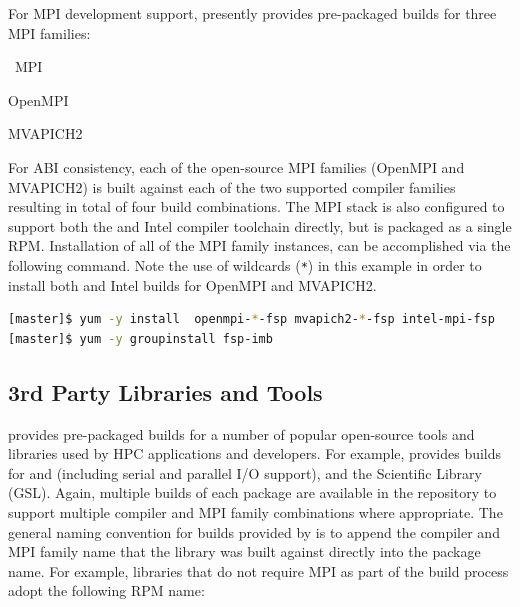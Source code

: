 \documentclass[letterpaper]{article}
\begin{document}
For MPI development support, \FSP{} presently provides pre-packaged builds for
three MPI families: 

\begin{itemize*}
\item \Intel{}~MPI
\item OpenMPI
\item MVAPICH2
\end{itemize*}
 For ABI consistency, each of the open-source MPI families (OpenMPI and
 MVAPICH2) is built against each of the two supported compiler families
 resulting in total of four build combinations.  The \Intel{} MPI stack is also
 configured to support both the \GNU{} and Intel compiler toolchain directly, but
 is packaged as a single RPM. Installation of all of the MPI family instances,
 can be accomplished via the following command. Note the use of wildcards
 (\texttt{*}) in this example in order to install both \GNU{} and Intel builds for
 OpenMPI and MVAPICH2.

\begin{lstlisting}[language=bash]
[master]$ yum -y install  openmpi-*-fsp mvapich2-*-fsp intel-mpi-fsp
[master]$ yum -y groupinstall fsp-imb
\end{lstlisting}



\subsection{3rd Party Libraries and Tools} \label{sec:3rdparty}

\FSP{} provides pre-packaged builds for a number of popular open-source
tools and libraries used by HPC applications and developers. For
example, \FSP{} provides builds for \FFTW{} and \hdffive{} (including serial and parallel
I/O support), and the \GNU{} Scientific Library (GSL). Again, multiple builds of
each package are available in the \FSP{} repository to support multiple compiler
and MPI family combinations where appropriate. The general naming convention
for builds provided by \FSP{} is to append the compiler and MPI family name that
the library was built against directly into the package name. For example,
libraries that do not require MPI as part of the build process adopt the
following RPM name: \\
\end{document}
